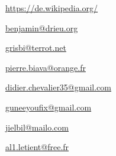 
\urldef{\urlWikipedia}%
\url{https://de.wikipedia.org/}






\urldef{\urlBenjaminDrieuEmail}%
\url{benjamin@drieu.org}     %



\urldef{\urlFrancoisTerrotEmail}%
\url{grisbi@terrot.net}     %


\urldef{\urlPierreBiavaEmail}%
\url{pierre.biava@orange.fr}     %

\urldef{\urlDidierChevalierEmail}%
\url{didier.chevalier35@gmail.com}     %

\urldef{\urlWilliamOllivierEmail}%
\url{guneeyoufix@gmail.com}     %


\urldef{\urlJeanLucDuflotEmail}%
\url{jielbil@mailo.com}     %

\urldef{\urlAlainLetientEmail}%
\url{al1.letient@free.fr}     %


